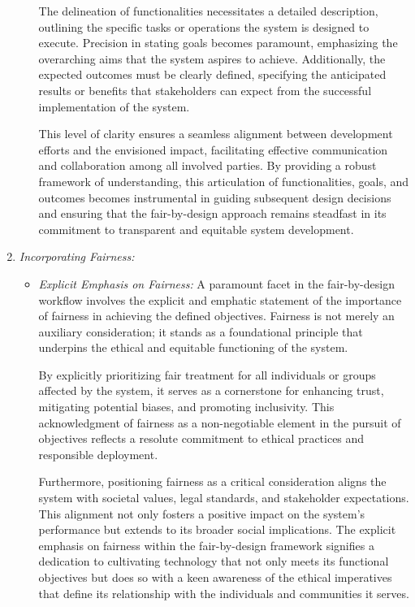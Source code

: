 \documentclass[12pt,a4paper,openright,twoside]{book}
\begin{document}
\begin{enumerate}
\begin{itemize}
            The delineation of functionalities necessitates a detailed description, outlining the specific tasks or operations the system is designed to execute. Precision in stating goals becomes paramount, emphasizing the overarching aims that the system aspires to achieve. Additionally, the expected outcomes must be clearly defined, specifying the anticipated results or benefits that stakeholders can expect from the successful implementation of the system.
            
            This level of clarity ensures a seamless alignment between development efforts and the envisioned impact, facilitating effective communication and collaboration among all involved parties. By providing a robust framework of understanding, this articulation of functionalities, goals, and outcomes becomes instrumental in guiding subsequent design decisions and ensuring that the fair-by-design approach remains steadfast in its commitment to transparent and equitable system development.        
        
        \end{itemize}
    
    \item \emph{Incorporating Fairness:}

        \begin{itemize}
            
            \item \emph{Explicit Emphasis on Fairness:} A paramount facet in the fair-by-design workflow involves the explicit and emphatic statement of the importance of fairness in achieving the defined objectives. Fairness is not merely an auxiliary consideration; it stands as a foundational principle that underpins the ethical and equitable functioning of the system.

            By explicitly prioritizing fair treatment for all individuals or groups affected by the system, it serves as a cornerstone for enhancing trust, mitigating potential biases, and promoting inclusivity. This acknowledgment of fairness as a non-negotiable element in the pursuit of objectives reflects a resolute commitment to ethical practices and responsible deployment.
            
            Furthermore, positioning fairness as a critical consideration aligns the system with societal values, legal standards, and stakeholder expectations. This alignment not only fosters a positive impact on the system's performance but extends to its broader social implications. The explicit emphasis on fairness within the fair-by-design framework signifies a dedication to cultivating technology that not only meets its functional objectives but does so with a keen awareness of the ethical imperatives that define its relationship with the individuals and communities it serves.
                                    

\end{itemize}
\end{enumerate}
\end{document}
